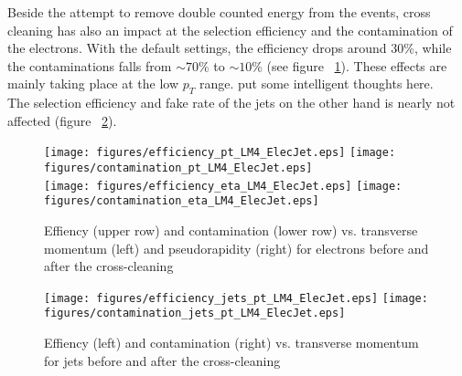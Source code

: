 \documentclass{cmspaper}
\begin{document}
Beside the attempt to remove double counted energy from the events, cross cleaning has also an impact at the selection efficiency and the contamination of the electrons. With the default settings, the efficiency drops around \(30 \%\), while the contaminations falls from \(\sim 70\%\) to \(\sim10\%\) (see figure ~\ref{fig:effCont_elec_ElecJet}). These effects are mainly taking place at the low \(p_T\) range. {\color{red}put some intelligent thoughts here.}\\
The selection efficiency and fake rate of the jets on the other hand is nearly not affected (figure ~\ref{fig:effCont_Jets_ElecJet}).
\begin{figure}[hb]
\begin{center}
    \texttt{[image: figures/efficiency\_pt\_LM4\_ElecJet.eps]}
    \texttt{[image: figures/contamination\_pt\_LM4\_ElecJet.eps]}\\
    \texttt{[image: figures/efficiency\_eta\_LM4\_ElecJet.eps]}
    \texttt{[image: figures/contamination\_eta\_LM4\_ElecJet.eps]}
    \caption{Effiency (upper row) and contamination (lower row) vs. transverse momentum (left) and pseudorapidity (right) for electrons before and after the cross-cleaning}
\label{fig:effCont_elec_ElecJet}
\end{center}
\end{figure}
\begin{figure}[hb]
\begin{center}
    \texttt{[image: figures/efficiency\_jets\_pt\_LM4\_ElecJet.eps]}
    \texttt{[image: figures/contamination\_jets\_pt\_LM4\_ElecJet.eps]}
    \caption{Effiency (left) and contamination (right) vs. transverse momentum for jets before
    and after the cross-cleaning}
\label{fig:effCont_Jets_ElecJet}
\end{center}
\end{figure}
\end{document}

